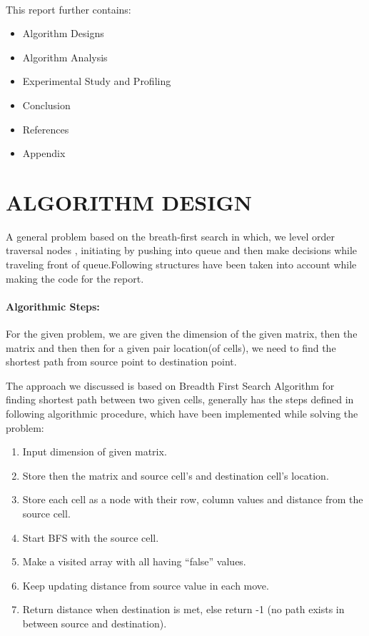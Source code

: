 \documentclass[10pt]{article}
\begin{document}
\begin{multicols*}{2}
\\This report further contains:
\begin{itemize}
\item 	Algorithm  Designs
\item 	Algorithm  Analysis
\item 	Experimental Study and Profiling
\item 	Conclusion
\item 	References
\item 	Appendix
\end{itemize}

\section*{ALGORITHM DESIGN}
A general problem based on the breath-first search in which, we level order traversal nodes , initiating by pushing into queue and then make decisions while traveling front of queue.Following structures have been taken into account while making the code for the report.

\paragraph{Algorithmic Steps:}

For the given problem, we are given the dimension of the given matrix, then the matrix and then then for a given pair location(of cells), we need to find the shortest path from source point to destination point. 

The approach we discussed is based on Breadth First Search Algorithm for finding shortest path between two given cells, generally has the steps defined in following algorithmic procedure, which have been implemented while solving the problem:
\begin{enumerate}

\item	Input dimension of given matrix. 
\item	Store then the matrix and source cell’s and destination cell’s location.
\item	Store each cell as a node with their row, column values and distance from the source cell.
\item	Start BFS with the source cell.

\item Make a visited array with all having “false” values.
\item Keep updating distance from source value in each move.
\item Return distance when destination is met, else return -1 (no path exists in between source and destination).
\end{enumerate}


\end{multicols*}
\end{document}

